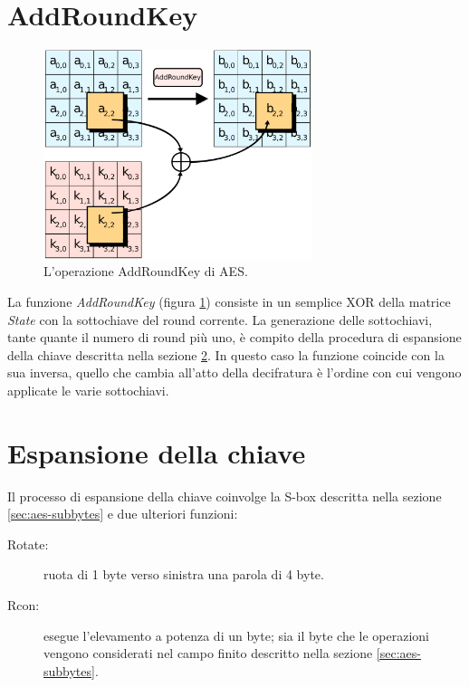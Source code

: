 \documentclass[12pt,a4paper,oneside]{book}
\begin{document}
\section{AddRoundKey}

\begin{figure}[h]
\begin{center}
\includegraphics[width=0.7\textwidth]{img/addroundkey}
\caption{L'operazione AddRoundKey di AES.\label{fig:aes-addroundkey}}
\end{center}
\end{figure}

La funzione \textit{AddRoundKey} (figura \ref{fig:aes-addroundkey}) consiste in un semplice XOR della matrice \textit{State} con la sottochiave del round corrente. La generazione delle sottochiavi, tante quante il numero di round più uno, è compito della procedura di espansione della chiave descritta nella sezione \ref{sec:aes-key-schedule}. In questo caso la funzione coincide con la sua inversa, quello che cambia all'atto della decifratura è l'ordine con cui vengono applicate le varie sottochiavi.

\section{Espansione della chiave}
\label{sec:aes-key-schedule}

Il processo di espansione della chiave coinvolge la \ac{S-box} descritta nella sezione \ref{sec:aes-subbytes} e due ulteriori funzioni:
\begin{description}
\item[Rotate:] ruota di 1 byte verso sinistra una parola di 4 byte.
\item[Rcon:] esegue l'elevamento a potenza di un byte; sia il byte che le operazioni vengono considerati nel campo finito descritto nella sezione \ref{sec:aes-subbytes}.
\end{description}
\end{document}
